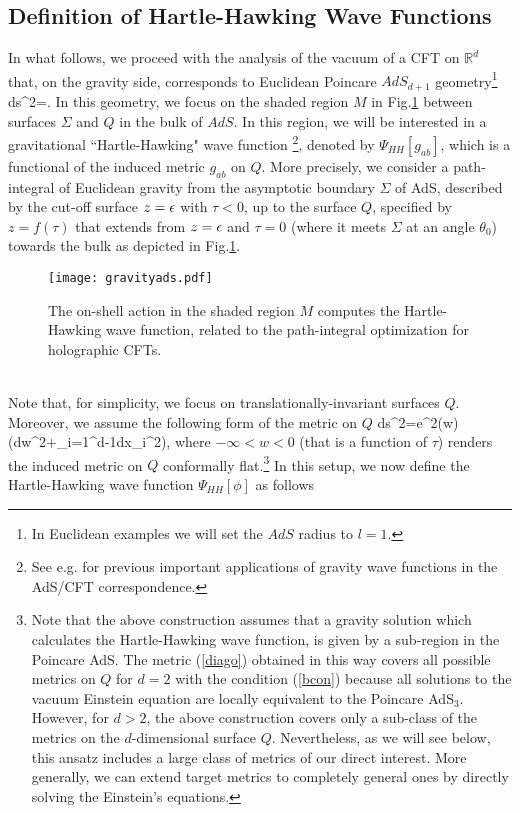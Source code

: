 \documentclass[a4paper,12pt]{article}
\begin{document}
\subsection{Definition of Hartle-Hawking Wave Functions}
In what follows, we proceed with the analysis of the vacuum of a CFT on $\mathbb{R}^{d}$ that, on the gravity side, corresponds to Euclidean Poincare $AdS_{d+1}$ geometry\footnote{In Euclidean examples we will set the $AdS$ radius to $l=1$.}
\ba
ds^2=.  \label{metx}
\ea
In this geometry, we focus on the shaded region $M$ in Fig.\ref{gravityfig} between surfaces $\Sigma$ and $Q$ in the bulk of $AdS$. In this region, we will be interested in a gravitational ``Hartle-Hawking" wave function \cite{Hartle:1983ai}\footnote{See e.g. \cite{Heemskerk:2010hk,Harlow:2011ke} for previous important applications of gravity wave functions in the AdS/CFT correspondence.}, denoted by $\Psi_{HH}[g_{ab}]$, which is a functional of the induced metric $g_{ab}$ on $Q$. More precisely, we consider a path-integral of Euclidean gravity from the asymptotic boundary $\Sigma$ of AdS, described by the cut-off surface $z=\epsilon$ with $\tau<0$, up to the surface $Q$, specified by $z=f(\tau)$ that extends from $z=\epsilon$ and $\tau=0$ (where it meets $\Sigma$ at an angle $\theta_0$) towards the bulk as depicted in Fig.\ref{gravityfig}. 
\begin{figure}[t!]
  \centering
  \texttt{[image: gravityads.pdf]}
  \caption{The on-shell action in the shaded region $M$
computes the Hartle-Hawking wave function, related to the path-integral optimization for holographic CFTs.}
\label{gravityfig}
\end{figure}\\
Note that, for simplicity, we focus on translationally-invariant surfaces $Q$. Moreover, we assume the following form of the metric on $Q$ 
\ba
ds^2=e^{2\phi(w)}(dw^2+\sum_{i=1}^{d-1}dx_i^2),  \label{diago}
\ea
where $-\infty<w<0$ (that is a function of $\tau$) renders the induced metric on $Q$ conformally flat.\footnote{Note that the above construction assumes  that a gravity solution which calculates the Hartle-Hawking wave function, is given by a sub-region in the Poincare AdS. The metric (\ref{diago}) obtained in this way covers all possible metrics on $Q$ for $d=2$ with the condition (\ref{bcon}) because all solutions to the vacuum Einstein equation are locally equivalent to the Poincare AdS$_3$. However, for $d>2$, the above construction covers only a sub-class of the metrics on the $d$-dimensional surface $Q$. Nevertheless, as we will see below, this ansatz includes a large class of metrics of our direct interest. More generally, we can extend target metrics to completely general ones by directly solving the Einstein's equations.}  In this setup, we now define the Hartle-Hawking wave function $\Psi_{HH}[\phi]$ as follows
\end{document}
